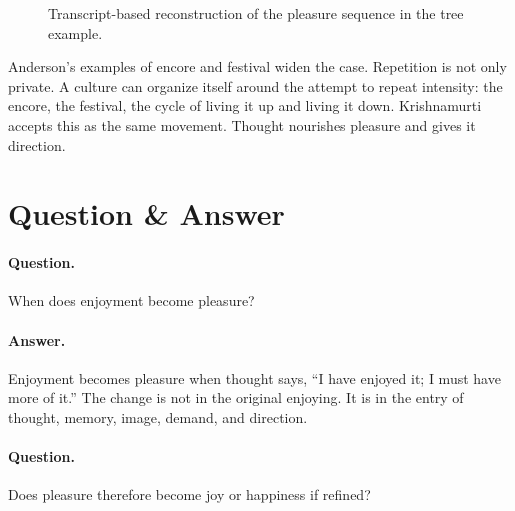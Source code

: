 \documentclass[11pt,oneside]{book}
\begin{document}
\begin{figure}
\centering
{}

Transcript-based reconstruction of the pleasure sequence in the tree example.
\end{figure}

Anderson's examples of encore and festival widen the case. Repetition is not only private. A culture can organize itself around the attempt to repeat intensity: the encore, the festival, the cycle of living it up and living it down. Krishnamurti accepts this as the same movement. Thought nourishes pleasure and gives it direction.

\section{Question \& Answer}

\paragraph{Question.}
When does enjoyment become pleasure?

\paragraph{Answer.}
Enjoyment becomes pleasure when thought says, ``I have enjoyed it; I must have more of it.'' The change is not in the original enjoying. It is in the entry of thought, memory, image, demand, and direction.

\paragraph{Question.}
Does pleasure therefore become joy or happiness if refined?
\end{document}
